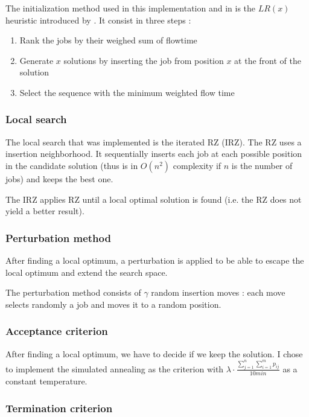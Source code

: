 \documentclass[a4paper]{article}
\begin{document}
The initialization method used in this implementation and in \cite{panruiz2012} is the $LR(x)$ heuristic introduced by \cite{liu2001}.  It consist in three steps :
\begin{enumerate}
    \item Rank the jobs by their weighed sum of flowtime
    \item Generate $x$ solutions by inserting the job from position $x$ at the front of the solution
    \item Select the sequence with the minimum weighted flow time
\end{enumerate}

\subsubsection{Local search}
\label{RZ}
The local search that was implemented is the iterated RZ (IRZ). The RZ uses a insertion neighborhood.
It sequentially inserts each job at each possible position in the candidate solution (thus is in $O(n^2)$ complexity if $n$ is the number of jobs) and keeps the best one.

The IRZ applies RZ until a local optimal solution is found (i.e. the RZ does not yield a better result).

\subsubsection{Perturbation method}
\label{pertu}

After finding a local optimum, a perturbation is applied to be able to escape the local optimum and extend the search space.

The perturbation method consists of $\gamma$ random insertion moves : each move selects randomly a job and moves it to a random position.

\subsubsection{Acceptance criterion}

After finding a local optimum, we have to decide if we keep the solution. I chose to implement the {simulated annealing} as the criterion with $\lambda \cdot \frac{\sum_{j=1}^{n} \sum_{i=1}^{m} p_{ij}}{10 min}$ as a constant temperature.

\subsubsection{Termination criterion}
\end{document}
